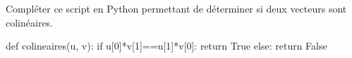 \documentclass[a4paper]{article}
\begin{document}
    \begin{exercice}{}{}
    Compléter ce script en Python permettant de déterminer si deux vecteurs sont colinéaires.
      \begin{center}
        \begin{CodePythontexAlt}[Largeur=0.75\linewidth, Centre, Lignes=false]{}
          def colineaires(u, v):
          if u[0]*v[1]==u[1]*v[0]:
            return True
          else:
            return False
          \end{CodePythontexAlt}
      \end{center}
    \end{exercice}
\end{document}
